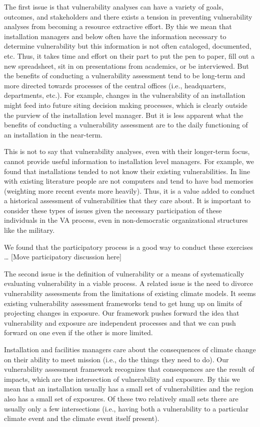 \documentclass[10pt]{amsart}
\begin{document}
The first issue is that vulnerability analyses can have a variety of goals, outcomes, and stakeholders and there exists a tension in preventing vulnerability analyses from becoming a resource extractive effort.
By this we mean that installation managers and below often have the information necessary to determine vulnerability but this information is not often cataloged, documented, etc.
Thus, it takes time and effort on their part to put the pen to paper, fill out a new spreadsheet, sit in on presentations from academics, or be interviewed.
But the benefits of conducting a vulnerability assessment tend to be long-term and more directed towards processes of the central offices (i.e., headquarters, departments, etc.).
For example, changes in the vulnerability of an installation might feed into future siting decision making processes, which is clearly outside the purview of the installation level manager.
But it is less apparent what the benefits of conducting a vulnerability assessment are to the daily functioning of an installation in the near-term.

This is not to say that vulnerability analyses, even with their longer-term focus, cannot provide useful information to installation level managers.
For example, we found that installations tended to not know their existing vulnerabilities.
In line with existing literature people are not computers and tend to have bad memories (weighting more recent events more heavily).
Thus, it is a value added to conduct a historical assessment of vulnerabilities that they care about.
It is important to consider these types of issues given the necessary participation of these individuals in the VA process, even in non-democratic organizational structures like the military. 

We found that the participatory process is a good way to conduct these exercises \ldots
[Move participatory discussion here]

The second issue is the definition of vulnerability or a means of systematically evaluating vulnerability in a viable process.
A related issue is the need to divorce vulnerability assessments from the limitations of existing climate models.
It seems existing vulnerability assessment frameworks tend to get hung up on limits of projecting changes in exposure.
Our framework pushes forward the idea that vulnerability and exposure are independent processes and that we can push forward on one even if the other is more limited. 

Installation and facilities managers care about the consequences of climate change on their ability to meet mission (i.e., do the things they need to do).
Our vulnerability assessment framework recognizes that consequences are the result of impacts, which are the intersection of vulnerability and exposure.
By this we mean that an installation usually has a small set of vulnerabilities and the region also has a small set of exposures. 
Of these two relatively small sets there are usually only a few intersections (i.e., having both a vulnerability to a particular climate event and the climate event itself present).
\end{document}
